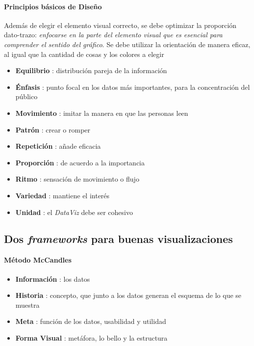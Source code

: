 \paragraph{Principios básicos de Diseño}
Además de elegir el elemento visual correcto, se debe optimizar la proporción dato-trazo: \textit{enfocarse en la parte del elemento visual que es esencial para comprender el sentido del gráfico}. Se debe utilizar la orientación de manera eficaz, al igual que la cantidad de cosas y los colores a elegir
\begin{itemize}
    \item {\textbf{Equilibrio} : distribución pareja de la información}
    \item {\textbf{Énfasis} : punto focal en los datos más importantes, para la concentración del público}
    \item {\textbf{Movimiento} : imitar la manera en que las personas leen}
    \item {\textbf{Patrón} : crear o romper}
    \item {\textbf{Repetición} : añade eficacia}
    \item {\textbf{Proporción} : de acuerdo a la importancia}
    \item {\textbf{Ritmo} : sensación de movimiento o flujo}
    \item {\textbf{Variedad} : mantiene el interés}
    \item {\textbf{Unidad} : el \textit{DataViz} debe ser cohesivo}
\end{itemize}

\subsection{Dos \textit{frameworks} para buenas visualizaciones}
\paragraph{Método McCandles}
\begin{itemize}
    \item {\textbf{Información} : los datos}
    \item {\textbf{Historia} : concepto, que junto a los datos generan el esquema de lo que se muestra}
    \item {\textbf{Meta} : función de los datos, usabilidad y utilidad}
    \item {\textbf{Forma Visual} : metáfora, lo bello y la estructura}
\end{itemize}


